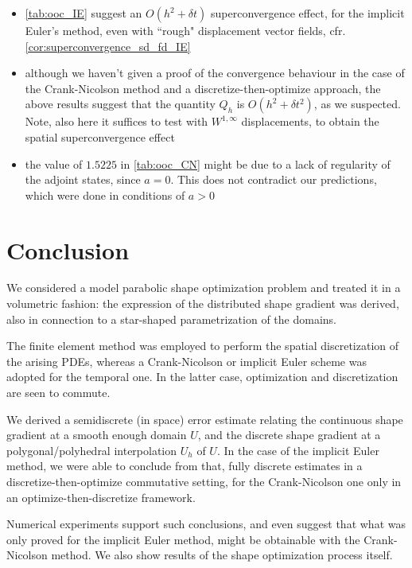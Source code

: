 \documentclass[english,a4paper,9pt,oneside]{scrbook}	%
\theoremstyle{break}
\theoremstyle{remark}
\begin{document}
\begin{itemize}
	\item \cref{tab:ooc_IE} suggest an $O(h^2+\delta t)$ superconvergence effect, for the implicit Euler's method, even with ``rough" displacement vector fields, cfr. \cref{cor:superconvergence_sd_fd_IE}
	\item although we haven't given a proof of the convergence behaviour in the case of the Crank-Nicolson method and a discretize-then-optimize approach, the above results suggest that the quantity $Q_h$ is $O(h^2+\delta t^2)$, as we suspected. Note, also here it suffices to test with $W^{1,\infty}$ displacements, to obtain the spatial superconvergence effect
	\item the value of $1.5225$ in \cref{tab:ooc_CN} might be due to a lack of regularity of the adjoint states, since $a=0$. This does not contradict our predictions, which were done in conditions of $a>0$
\end{itemize}

\chapter{Conclusion}
\label{chap:conclusion}

We considered a model parabolic shape optimization problem and treated it in a volumetric fashion: the expression of the distributed shape gradient was derived, also in connection to a star-shaped parametrization of the domains.

The finite element method was employed to perform the spatial discretization of the arising PDEs, whereas a Crank-Nicolson or implicit Euler scheme was adopted for the temporal one. In the latter case, optimization and discretization are seen to commute.

We derived a semidiscrete (in space) error estimate relating the continuous shape gradient at a smooth enough domain $U$, and the discrete shape gradient at a polygonal/polyhedral interpolation $U_h$ of $U$. In the case of the implicit Euler method, we were able to conclude from that, fully discrete estimates in a discretize-then-optimize commutative setting, for the Crank-Nicolson one only in an optimize-then-discretize framework.

Numerical experiments support such conclusions, and even suggest that what was only proved for the implicit Euler method, might be obtainable with the Crank-Nicolson method. We also show results of the shape optimization process itself.
\end{document}
